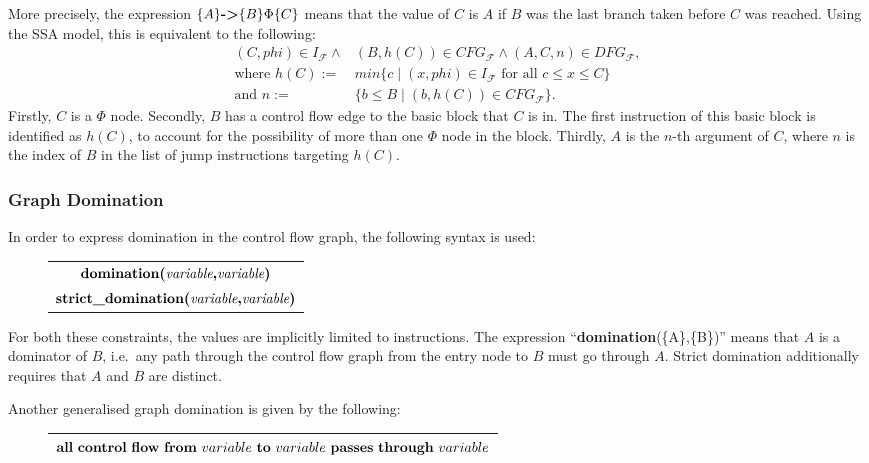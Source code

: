     \noindent
    More precisely, the expression $\{A\}\text{\bf ->}\{B\}\Phi\{C\}$ means that
    the value of $C$ is $A$ if $B$ was the last branch taken before $C$ was
    reached.
    Using the SSA model, this is equivalent to the following:
    \begin{align*}
        (C,phi)\in I_\mathcal F\mathrel\land{}&(B,h(C))\in CFG_\mathcal F\mathrel\land(A,C,n)\in DFG_\mathcal F,\\
            \text{where }h(C):={}&min\{c\mid (x,phi)\in I_\mathcal F\text{ for all }c\leq x\leq C\}\\
            \text{and }n:={}&\{b\leq B\mid (b,h(C))\in CFG_\mathcal F\}.
    \end{align*}
    Firstly, $C$ is a $\Phi$ node.
    Secondly, $B$ has a control flow edge to the basic block that $C$ is in.
    The first instruction of this basic block is identified as $h(C)$, to
    account for the possibility of more than one $\Phi$ node in the block.
    Thirdly, $A$ is the $n$-th argument of $C$, where $n$ is the index of $B$ in
    the list of jump instructions targeting $h(C)$.

\subsubsection*{Graph Domination}

    In order to express domination in the control flow graph, the following
    syntax is used:
\begin{figure}[h]
    \centering
    \begin{tabular}{|c|}
        \hline
        $\text{\bf domination(}\text{\it variable}\text{\bf,} \text{\it variable}\text{\bf)}$\\
        $\text{\bf strict\_domination(}\text{\it variable}\text{\bf,} \text{\it variable}\text{\bf)}$\\
        \hline
    \end{tabular}
\end{figure}

    \noindent
    For both these constraints, the values are implicitly limited to
    instructions.
    The expression ``{\bf domination}(\{A\},\{B\})'' means that $A$ is a
    dominator of $B$, i.e.\ any path through the control flow graph from the
    entry node to $B$ must go through $A$.
    Strict domination additionally requires that $A$ and $B$ are distinct.

    Another generalised graph domination is given by the following:
\begin{figure}[h]
    \centering
    \begin{tabular}{|c|}
        \hline
        ${\bf all}\ {\bf control}\ {\bf flow}\ {\bf from}\ variable\ {\bf to}\ variable\ {\bf passes}\ {\bf through}\ variable$\\
        \hline
    \end{tabular}
\end{figure}

